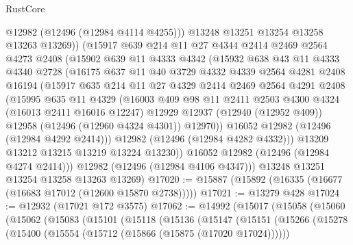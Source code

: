 \begin{lexlean}{RustCore}
\begin{coremodule}
              @12982
              (@12496 (@12984 @4114 @4255)))
            @13248
            @13251
            @13254
            @13258
            @13263
            @13269))
        (@15917
          @639
          @214
          @11
          @27
          @4344
          @2414
          @2469
          @2564
          @4273
          @2408
          (@15902
            @639
            @11
            @4333
            @4342
            (@15932
              @638
              @43
              @11
              @4333
              @4340
              @2728
              (@16175
                @637
                @11
                @40
                @3729
                @4332
                @4339
                @2564
                @4281
                @2408
                @16194
                (@15917
                  @635
                  @214
                  @11
                  @27
                  @4329
                  @2414
                  @2469
                  @2564
                  @4291
                  @2408
                  (@15995
                    @635
                    @11
                    @4329
                    (@16003
                      @409
                      @98
                      @11
                      @2411
                      @2503
                      @4300
                      @4324
                      (@16013 @2411 @16016 @12247)
                      @12929
                      @12937
                      (@12940 (@12952 @409))
                      @12958
                      (@12496 (@12960 @4324 @4301))
                      @12970))
                  @16052
                  @12982
                  (@12496 (@12984 @4292 @2414)))
                @12982
                (@12496 (@12984 @4282 @4332)))
              @13209
              @13212
              @13215
              @13219
              @13224
              @13230))
          @16052
          @12982
          (@12496 (@12984 @4274 @2414)))
        @12982
        (@12496 (@12984 @4106 @4347)))
      @13248
      @13251
      @13254
      @13258
      @13263
      @13269)
@17020 := @15887 (@15892 (@16335 (@16677 (@16683 @17012 (@12600 @15870 @2738)))))
@17021 := @13279 @428
@17024 := @12932 (@17021 @172 @3575)
@17062 := @14992
    (@15017
      (@15058
        (@15060
          (@15062
            (@15083
              (@15101
                (@15118
                  (@15136
                    (@15147
                      (@15151
                        (@15266
                          (@15278
                            (@15400 (@15554 (@15712 (@15866 (@15875 (@17020 @17024))))))

\end{coremodule}
\end{lexlean}
